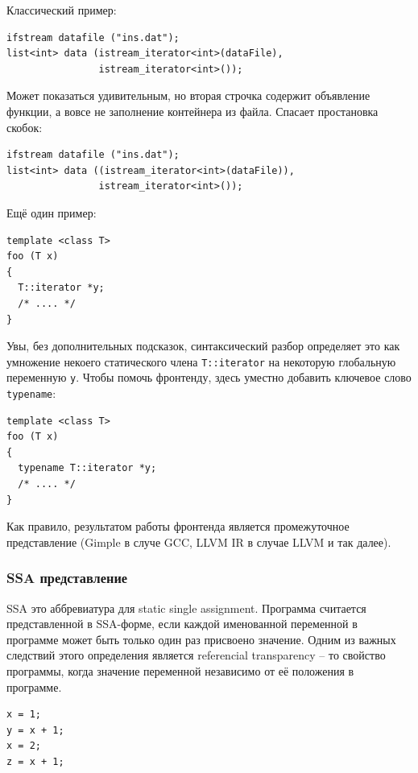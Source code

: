 \documentclass[a4paper,12pt,oneside]{article}
\begin{document}
Классический пример:

\begin{lstlisting}
ifstream datafile ("ins.dat");
list<int> data (istream_iterator<int>(dataFile),
                istream_iterator<int>());
\end{lstlisting}

Может показаться удивительным, но вторая строчка содержит объявление функции, а вовсе не заполнение контейнера из файла. Спасает простановка скобок:

\begin{lstlisting}
ifstream datafile ("ins.dat");
list<int> data ((istream_iterator<int>(dataFile)),
                istream_iterator<int>());
\end{lstlisting}

Ещё один пример:

\begin{lstlisting}
template <class T>
foo (T x)
{
  T::iterator *y;
  /* .... */
}
\end{lstlisting}

Увы, без дополнительных подсказок, синтаксический разбор определяет это как умножение некоего статического члена \lstinline!T::iterator! на некоторую глобальную переменную \lstinline!y!. Чтобы помочь фронтенду, здесь уместно добавить ключевое слово \lstinline!typename!:

\begin{lstlisting}
template <class T>
foo (T x)
{
  typename T::iterator *y;
  /* .... */
}
\end{lstlisting}

Как правило, результатом работы фронтенда является промежуточное представление (Gimple в случе GCC, LLVM IR в случае LLVM и так далее).

\subsubsection{SSA представление}\label{subsubsec:SSA}

SSA это аббревиатура для static single assignment. Программа считается представленной в SSA-форме, если каждой именованной переменной в программе может быть только один раз присвоено значение. Одним из важных следствий этого определения является referencial transparency -- то свойство программы, когда значение переменной независимо от её положения в программе.

\begin{lstlisting}
x = 1;
y = x + 1;
x = 2;
z = x + 1;
\end{lstlisting}
\end{document}

